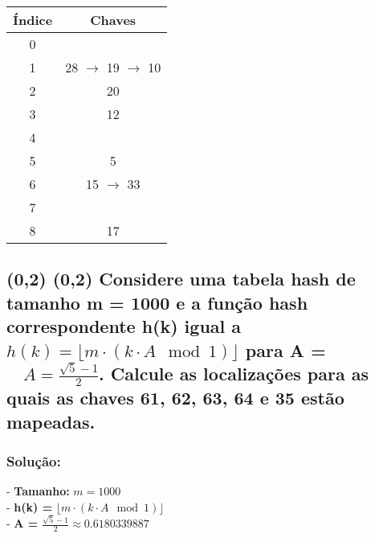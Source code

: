 \documentclass{article}
\begin{document}
\begin{enumerate}
\begin{itemize}
      \begin{center}
        \begin{tabular}{|c|c|}
        \hline
        \textbf{Índice} & \textbf{Chaves} \\
        \hline
        0 &  \\
        1 & 28 $\rightarrow$ 19 $\rightarrow$ 10\\
        2 & 20\\
        3 & 12\\
        4 &  \\
        5 & 5 \\
        6 & 15 $\rightarrow$ 33\\
        7 &  \\
        8 & 17\\
        \hline
        \end{tabular}
      \end{center}
    \end{itemize}
\end{enumerate}

\subsection {(0,2) (0,2) Considere uma tabela hash de tamanho m = 1000 e a função hash
correspondente h(k) igual a $
   h(k) = \lfloor m \cdot (k \cdot A \mod 1) \rfloor
   $
para A = $ \quad A = \frac{\sqrt{5} - 1}{2}$.
Calcule as localizações para as quais as chaves 61, 62, 63, 64 e 35 estão mapeadas.}

\subsubsection{Solução:}

- \textbf{Tamanho:} $ m = 1000$ \\
- \textbf{h(k) = } $ \lfloor m \cdot (k \cdot A \mod 1) \rfloor
   $\\
- \textbf{A = } $ \frac{\sqrt{5} - 1}{2} \approx 0.6180339887
   $
\end{document}
